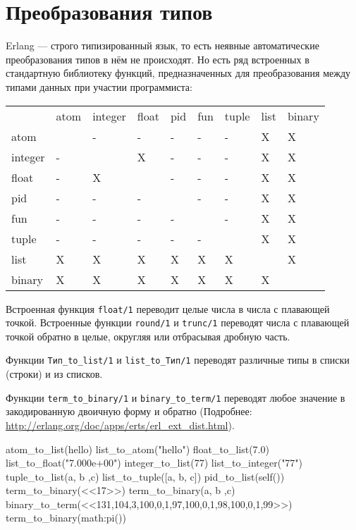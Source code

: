 \section{Преобразования типов}

Erlang --- строго типизированный язык, то есть неявные автоматические 
преобразования типов в нём не происходят. Но есть ряд встроенных в стандартную
библиотеку функций, предназначенных для преобразования между типами данных
при участии программиста:

\begin{center}
\begin{tabular}{|>{\raggedright}p{63pt}|>{\raggedright}p{30pt}|>{\raggedright}p{35pt}|>{\raggedright}p{21pt}|>{\raggedright}p{21pt}|>{\raggedright}p{21pt}|>{\raggedright}p{30pt}|>{\raggedright}p{21pt}|>{\raggedright}p{35pt}|}
\hline
\multicolumn{9}{|p{243pt}|}{Преобразования типов}\tabularnewline
\hline
 & atom & integer & float & pid & fun & tuple & list & binary\tabularnewline
\hline
atom &  & - & - & - & - & - & X & X\tabularnewline
\hline
integer & - &  & X & - & - & - & X & X\tabularnewline
\hline
float & - & X &  & - & - & - & X & X\tabularnewline
\hline
pid & - & - & - &  & - & - & X & X\tabularnewline
\hline
fun & - & - & - & - &  & - & X & X\tabularnewline
\hline
tuple & - & - & - & - & - &  & X & X\tabularnewline
\hline
list & X & X & X & X & X & X &  & X\tabularnewline
\hline
binary & X & X & X & X & X & X & X & \tabularnewline
\hline
\end{tabular}
\end{center}

Встроенная функция \texttt{float/1} переводит целые числа в числа с 
плавающей точкой. Встроенные функции \texttt{round/1} и \texttt{trunc/1}
переводят числа с плавающей точкой обратно в целые, округляя или отбрасывая
дробную часть.

Функции \texttt{Тип\_to\_list/1} и \texttt{list\_to\_Тип/1}
переводят различные типы в списки (строки) и из списков.

Функции \texttt{term\_to\_binary/1} и \texttt{binary\_to\_term/1} переводят 
любое значение в закодированную двоичную форму и обратно (Подробнее: 
\url{http://erlang.org/doc/apps/erts/erl_ext_dist.html}).

\begin{erlang}
atom_to_list(hello)        %
list_to_atom("hello")      %
float_to_list(7.0)         %
list_to_float("7.000e+00") %
integer_to_list(77)        %
list_to_integer("77")      %
tuple_to_list({a, b ,c})   %
list_to_tuple([a, b, c])   %
pid_to_list(self())        %
term_to_binary(<<17>>)     %
term_to_binary({a, b ,c})  %
binary_to_term(<<131,104,3,100,0,1,97,100,0,1,98,100,0,1,99>>)  
term_to_binary(math:pi())  %
\end{erlang}

